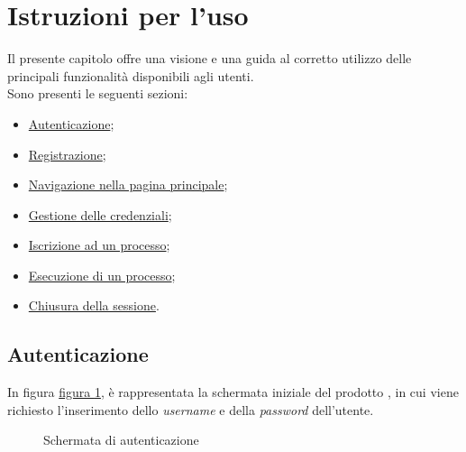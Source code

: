 \section{Istruzioni per l'uso}
\label{istruzioni}

Il presente capitolo offre una visione e una guida al corretto utilizzo delle principali funzionalità disponibili agli utenti.\\
Sono presenti le seguenti sezioni:

\begin{itemize}
\item  \hyperref[autenticazione]{Autenticazione};
\item  \hyperref[registrazione]{Registrazione};
\item  \hyperref[home]{Navigazione nella pagina principale};
\item  \hyperref[userdata]{Gestione delle credenziali};
\item  \hyperref[iscrizione]{Iscrizione ad un processo};
\item  \hyperref[gestione]{Esecuzione di un processo};
\item  \hyperref[logout]{Chiusura della sessione}.
\end{itemize}

\pagebreak

\subsection{Autenticazione}
\label{autenticazione}

In figura \hyperref[fig:Flogin]{figura \ref{fig:Flogin}}, è rappresentata la schermata iniziale del prodotto \progetto{}, in cui viene richiesto l'inserimento dello \textit{username} e della \textit{password} dell'utente.

\begin{figure}[H] \centering 
{} \caption{Schermata di autenticazione}
\label{fig:Flogin}
\end{figure}

